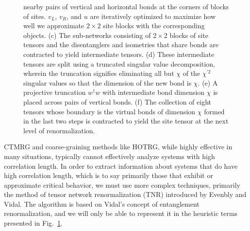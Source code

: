 \documentclass[aps,prb,letterpaper,superscriptaddress,twocolumn,showpacs,floatfix,10pt]{revtex4-1}
\begin{document}
\begin{figure}
{nearby pairs of vertical and horizontal bonds at the
corners of blocks of sites. $v_L$, $v_R$, and $u$ are iteratively optimized
to maximize how well we approximate $2\times 2$ site blocks with the
corresponding objects.
(c) The sub-networks consisting of $2\times 2$ blocks of site tensors and
the disentanglers and isometries that share bonds are contracted to yield
intermediate tensors.
(d) These intermediate tensors are split using a truncated
singular value decomposition, wherein the truncation signifies eliminating
all but $\chi$ of the $\chi^{\prime 2}$ singular values so that the dimension
of the new bond is $\chi$.
(e) A projective truncation $w^\dagger w$ with intermediate bond dimension
$\chi$ is placed across pairs of vertical bonds.
(f) The collection of eight tensors whose boundary is the virtual bonds of
dimension $\chi$ formed in the last two steps is contracted to yield the site
tensor at the next level of renormalization.}
\label{fig:EVTNR}
\end{figure}
CTMRG and coarse-graining methods like HOTRG, while highly effective in many
situations, typically cannot effectively analyze systems with high correlation
length. In order to extract information about systems that do have high
correlation length, which is to say primarily those that exhibit or approximate
critical behavior, we must use more complex techniques, primarily the method
of tensor network renormalization (TNR) introduced by Evenbly and Vidal.
\cite{TNR,TNRMERA,TNR3,TNRHauru,TNRlocal} The algorithm is
based on Vidal's concept of entanglement renormalization,
and we will only be able to represent it in the heuristic terms presented in
Fig.~\ref{fig:EVTNR}.
\end{document}
